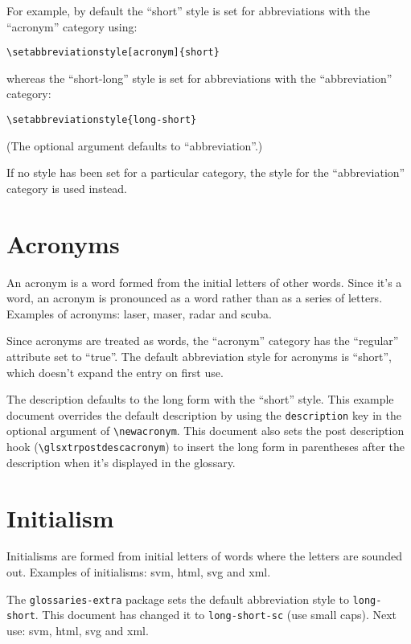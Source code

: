 \documentclass{report}
\renewcommand*{\glsxtrpostdescacronym}{%
 \space(\textsc{acronym:} \glsentrylong{\glscurrententrylabel})%
}
\begin{document}
For example, by default the ``short'' style is set for abbreviations
with the ``acronym'' category using:
\begin{verbatim}
\setabbreviationstyle[acronym]{short}
\end{verbatim}
whereas the ``short-long'' style is set for abbreviations with the
``abbreviation'' category:
\begin{verbatim}
\setabbreviationstyle{long-short}
\end{verbatim}
(The optional argument defaults to ``abbreviation''.)

If no style has been set for a particular category, the style for the 
``abbreviation'' category is used instead.

\section{Acronyms}

An acronym is a word formed from the initial letters of other words. 
Since it's a word, an acronym is pronounced as a word rather than as
a series of letters. Examples of acronyms: \gls{laser}, \gls{maser},
\gls{radar} and \gls{scuba}.

Since acronyms are treated as words, the ``acronym'' category 
has the ``regular'' attribute set to ``true''. The default
abbreviation style for acronyms is ``short'', which doesn't expand
the entry on first use.

The description defaults to the long
form with the ``short'' style. This example document overrides
the default description by using the \texttt{description}
key in the optional argument of \verb|\newacronym|. This 
document also sets the post description hook
(\verb|\glsxtrpostdescacronym|) to insert the long form in
parentheses after the description when it's displayed in the glossary.

\section{Initialism}

Initialisms are formed from initial letters of words where the
letters are sounded out. Examples of initialisms: 
\gls{svm}, \gls{html}, \gls{svg} and \gls{xml}.

The \texttt{glossaries-extra} package sets the default abbreviation
style to \texttt{long-short}. This document has changed it to
\texttt{long-short-sc} (use small caps). Next use: 
\gls{svm}, \gls{html}, \gls{svg} and \gls{xml}.
\end{document}
